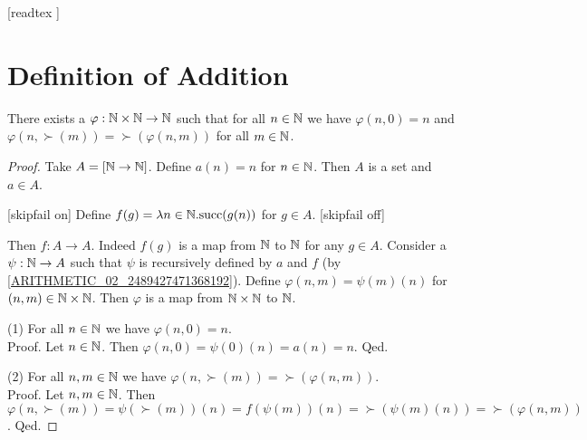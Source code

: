 \documentclass[10pt]{article}
\begin{document}
  \begin{imports}
    \begin{forthel}

      [readtex ]

    \end{forthel}
  \end{imports}


  \section{Definition of Addition}

  \begin{forthel}
    \begin{lemma}
      There exists a $\varphi : \mathbb{N} \times \mathbb{N} \to \mathbb{N}$ such
      that for all $n \in \mathbb{N}$ we have $\varphi(n,0) = n$ and
      $\varphi(n,\succ(m)) = \succ(\varphi(n,m))$ for all $m \in \mathbb{N}$.
    \end{lemma}
    \begin{proof}
      Take $A = [\mathbb{N} \to \mathbb{N}]$.
      Define $a(n) = n$ for $n \in \mathbb{N}$.
      Then $A$ is a set and $a \in A$.

      [skipfail on] %
      Define $f(g) = \mathrm{\lambda} n \in \mathbb{N}. \textrm{succ}(g(n))$ for $g \in A$.
      [skipfail off]

      Then $f : A \to A$.
      Indeed $f(g)$ is a map from $\mathbb{N}$ to $\mathbb{N}$ for any $g \in A$.
      Consider a $\psi : \mathbb{N} \to A$ such that $\psi$ is recursively defined by
      $a$ and $f$ (by \cref{ARITHMETIC_02_2489427471368192}).
      Define $\varphi(n,m) = \psi(m)(n)$ for $(n,m) \in \mathbb{N} \times \mathbb{N}$.
      Then $\varphi$ is a map from $\mathbb{N} \times \mathbb{N}$ to $\mathbb{N}$.

      (1) For all $n \in \mathbb{N}$ we have $\varphi(n,0) = n$. \\
      Proof.
        Let $n \in \mathbb{N}$.
        Then $\varphi(n,0)
          = \psi(0)(n)
          = a(n)
          = n$.
      Qed.

      (2) For all $n, m \in \mathbb{N}$ we have $\varphi(n, \succ(m)) =
      \succ(\varphi(n,m))$. \\
      Proof.
        Let $n, m \in \mathbb{N}$.
        Then $\varphi(n, \succ(m))
          = \psi(\succ(m))(n)
          = f(\psi(m))(n)
          = \succ(\psi(m)(n))
          = \succ(\varphi(n,m))$.
      Qed.
    \end{proof}
  \end{forthel}
\end{document}
